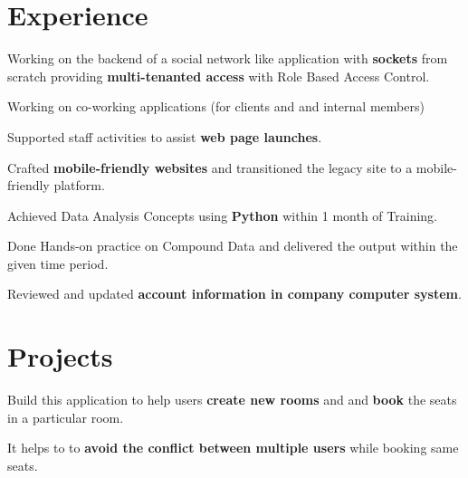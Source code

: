 \documentclass[]{deedy-resume-openfont}
\begin{document}
\hfill
\begin{minipage}[t]{0.66\textwidth} 


\section{Experience}

\vspace{\topsep} %
\begin{tightemize}
\item Working on the backend of a social network like application with \textbf{sockets} from scratch providing \textbf{multi-tenanted access} with Role Based Access Control.
\item Working on co-working applications (for clients and and internal members)
\end{tightemize}

\sectionsep

\begin{tightemize}
\item Supported staff activities to assist \textbf{web page launches}.
\item Crafted \textbf{mobile-friendly websites} and transitioned the legacy site to a mobile-friendly platform.
\end{tightemize}

\begin{tightemize}
\item Achieved Data Analysis Concepts using \textbf{Python} within 1 month of Training.
\item Done Hands-on practice on Compound Data and delivered the output within the given time period.
\item Reviewed and updated \textbf{account information in company computer system}.
\end{tightemize}
\sectionsep



\section{Projects}
{\href{https://github.com/Niharika100/Niharika100-bookRoom_backend}{\bf{}}}
\begin{tightemize}
\item Build this application to help users \textbf{create new rooms} and and \textbf{book} the seats in a particular room.
\item It helps to to \textbf{avoid the conflict between multiple users} while booking same seats.
\end{tightemize}


\end{minipage}
\end{document}
